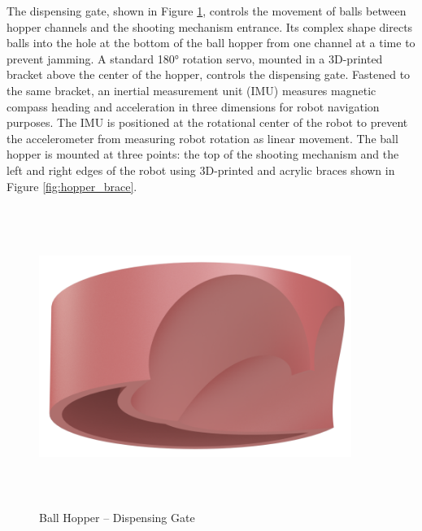 The dispensing gate, shown in Figure \ref{fig:dispensing_gate}, controls the movement of balls between hopper channels and the shooting mechanism entrance. Its complex shape directs balls into the hole at the bottom of the ball hopper from one channel at a time to prevent jamming. A standard \ang{180} rotation servo, mounted in a 3D-printed bracket above the center of the hopper, controls the dispensing gate.  Fastened to the same bracket, an inertial measurement unit (IMU) measures magnetic compass heading and acceleration in three dimensions for robot navigation purposes. The IMU is positioned at the rotational center of the robot to prevent the accelerometer from measuring robot rotation as linear movement. The ball hopper is mounted at three points: the top of the shooting mechanism and the left and right edges of the robot using 3D-printed and acrylic braces shown in Figure \ref{fig:hopper_brace}. 
\begin{figure}[H]   %
	\centering \includegraphics[width=4in, height=3.85in, keepaspectratio]{figures/dispensing_gate.png}
	\caption{Ball Hopper -- Dispensing Gate}	\label{fig:dispensing_gate}
\end{figure}
